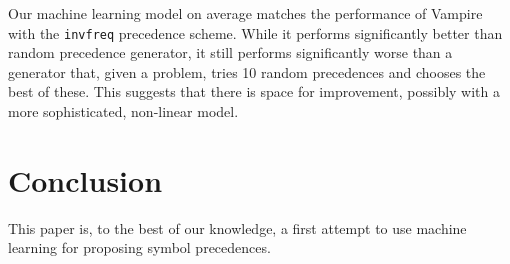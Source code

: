 Our machine learning model on average matches the performance
of Vampire with the \texttt{invfreq} precedence scheme.
While it performs significantly better than random precedence generator,
it still performs significantly worse than a generator
that, given a problem, tries 10 random precedences and chooses the best of these.
This suggests that there is space for improvement, possibly with a more sophisticated, non-linear model.



\section{Conclusion}

This paper is, to the best of our knowledge, a first attempt to use machine learning for proposing symbol precedences.






